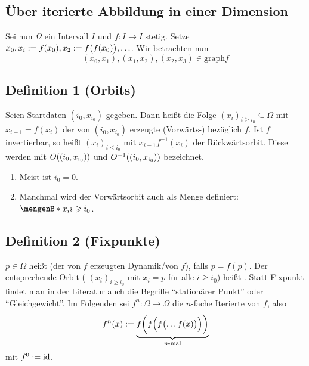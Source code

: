 \subsection*{Über iterierte Abbildung in einer Dimension} %
\label{sub:uber_iterierte_abbildung_in_einer_dimension}
Sei nun $\Omega $ ein Intervall $I$ und $f \colon I \to I$ stetig. Setze $x_0, x_i := f(x_0), x_2 := f \enbrace[\big]{f(x_0)},\ldots $. Wir betrachten nun
\[
	(x_0,x_1), (x_1, x_2), (x_2, x_3) \in \mathrm{graph} f
\]

\subsection{Definition 1 (Orbits)} %
\label{sub:definition_1}
Seien Startdaten $(i_0,x_{i_0})$ gegeben. Dann heißt die Folge $(x_i)_{i \ge i_0} \subseteq \Omega$ mit $x_{i+1}=f(x_i)$ der von $(i_0,x_{i_0})$ erzeugte 
(Vorwärts-) bezüglich $f$. Ist $f$ invertierbar, so heißt $(x_i)_{i \le i_0}$ mit $x_{i-1} f ^{-1}(x_i)$ der Rückwärtsorbit. Diese werden mit 
$O \enbrace*{(i_0,x_{i_0})}$ und $O ^{-1} \enbrace*{(i_0,x_{i_0})}$ bezeichnet.
\begin{enumerate}[(1)]
	\item Meist ist $i_0=0$.
	\item Manchmal wird der Vorwärtsorbit auch als Menge definiert: $\set[x_i]{i \ge i_0}$.
\end{enumerate}

\subsection{Definition 2 (Fixpunkte)} %
\label{sub:definition_2}
$p \in \Omega$ heißt  (der von $f$ erzeugten Dynamik/von $f$), falls $p=f(p)$. Der entsprechende Orbit ( $(x_i)_{i \ge i_0}$ mit $x_i=p$ für alle $i \ge i_0$)
heißt .
Statt Fixpunkt findet man in der Literatur auch die Begriffe \enquote{stationärer Punkt} oder \enquote{Gleichgewicht}.
Im Folgenden sei $f^n \colon \Omega \to \Omega$ die $n$-fache Iterierte von $f$, also
\[
	f^n(x) := \Underbrace{f \enbrace[\bigg]{f \enbrace[\Big]{f \enbrace[\big]{\ldots f(x)} } } }{\text{$n$-mal}}
\]
mit $f^0 := \id$.

